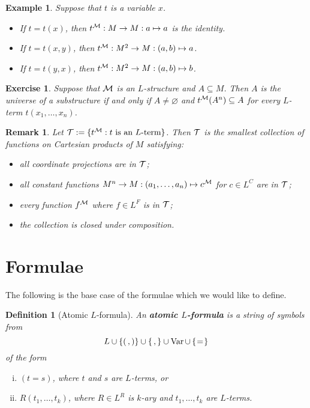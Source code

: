 \documentclass[10pt]{article}
\DeclareMathOperator{\Var}{Var}
\theoremstyle{newstyle}
\newtheorem{remark}[thm]{Remark}
\newtheorem{defn}[thm]{Definition}
\newtheorem{exercise}[thm]{Exercise}
\newtheorem{exmp}[thm]{Example}
\begin{document}
\begin{exmp}
Suppose that $t$ is a variable $x$.
\begin{itemize}
    \item If $t = t(x)$, then $t^{\cal M} : M \to M : a \mapsto a$ is the identity.
    \item If $t = t(x, y)$, then $t^{\cal M} : M^2 \to M : (a, b) \mapsto a$.
    \item If $t = t(y, x)$, then $t^{\cal M} : M^2 \to M : (a, b) \mapsto b$.
\end{itemize}
\end{exmp}

\begin{exercise}
Suppose that ${\cal M}$ is an $L$-structure and $A \subseteq M$. Then 
$A$ is the universe of a substructure if and only if 
$A \neq \varnothing$ and $t^{\cal M}(A^n) \subseteq A$ for every $L$-term 
$t(x_1, \dots, x_n)$. 
\end{exercise}

\begin{remark}
Let ${\cal T} := \{t^{\cal M} : t \text{ is an $L$-term}\}$. Then ${\cal T}$ is the 
smallest collection of functions on Cartesian products of $M$ satisfying:
\begin{itemize}
    \item all coordinate projections are in ${\cal T}$;
    \item all constant functions $M^n \to M : (a_1, \dots, a_n) \mapsto c^{\cal M}$ 
    for $c \in L^C$ are in ${\cal T}$; 
    \item every function $f^{\cal M}$ where $f \in L^F$ is in ${\cal T}$;
    \item the collection is closed under composition.
\end{itemize}
\end{remark}

\newpage 
\section{Formulae}

The following is the base case of the formulae which we would like to define. 

\begin{defn}[Atomic $L$-formula] 
An {\bf atomic $L$-formula} is a string of symbols from 
\[ L \cup \{(\,, )\} \cup \{\,,\} \cup \Var \cup \,\{\hspace{0.2ex}=\hspace{0.2ex}\} \] 
of the form
\begin{enumerate}[(i)]
    \item $(t=s)$, where $t$ and $s$ are $L$-terms, or 
    \item $R(t_1, \dots, t_k)$, where $R \in L^R$ is $k$-ary and $t_1, \dots, t_k$ are $L$-terms.
\end{enumerate}
\end{defn}
\end{document}
